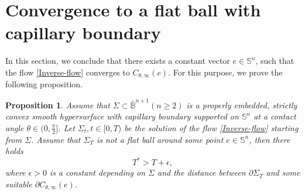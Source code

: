 \documentclass[11pt,reqno]{amsart}
\newtheorem{prop}[thm]{Proposition}
\theoremstyle{definition}
\theoremstyle{remark}
\numberwithin{equation}{section}
\renewcommand{\(}{\left(}
\renewcommand{\)}{\right)}
\renewcommand{\-}{\overline}
\begin{document}
\section{Convergence to a flat ball with capillary boundary}\label{Sec-Con}
In this section, we conclude that there exists a constant vector $e\in\mathbb{S}^n$, such that the flow \eqref{Inverse-flow} converges to $C_{\theta,\infty}(e)$. For this purpose, we prove the following proposition.
\begin{prop}
		Assume that $\Sigma\subset\bar{\mathbb{B}}^{n+1} (n\geq 2)$ is a properly embedded, strictly convex smooth hypersurface with capillary boundary supported on $\mathbb{S}^n$ at a contact angle $\theta\in(0,\frac{\pi}{2}]$. Let $\Sigma_t,t\in[0,T)$ be the solution of the flow \eqref{Inverse-flow} starting from $\Sigma$. Assume that $\Sigma_{T}$ is not a flat ball around some point $e\in\mathbb{S}^n$, then there holds
		\begin{equation}
			T^{*}>T+\epsilon,
		\end{equation}
	where $\epsilon>0$ is a constant depending on $\Sigma$ and the distance between $\partial\Sigma_T$ and some suitable $\partial C_{\theta,\infty}(e)$.
\end{prop}
\end{document}
